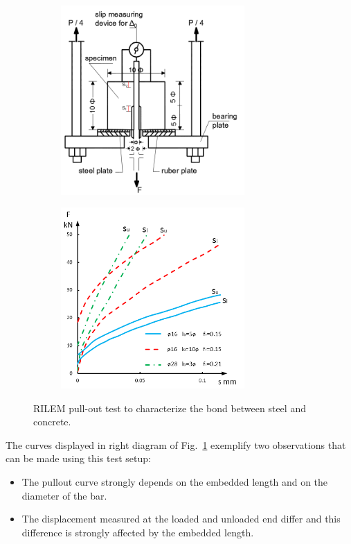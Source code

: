 \documentclass[main.tex]{subfiles}
\begin{document}
\begin{figure}[tbh]
	\centering
	\begin{subfigure}{0.45\textwidth}
	\centering
  \includegraphics[width=7cm]{fig/Lecture02/_300___pullout.png}
	\end{subfigure}
	\begin{subfigure}{0.45\textwidth}
	\centering
  \includegraphics[width=7cm]{fig/Lecture02/_300___pullout-rilem.png}
	\end{subfigure}
	\caption{RILEM pull-out test to characterize the bond between steel and concrete.}
	\label{fig_pull-out_rilem}
\end{figure}
The curves displayed in right diagram of Fig.~\ref{fig_pull-out_rilem} exemplify 
two observations that can be made using this test setup:
\begin{itemize}
    \item The pullout curve strongly depends on the embedded length and on the diameter of the bar.
    \item The displacement measured at the loaded and unloaded end differ and this difference is strongly affected by the embedded length.
\end{itemize}
\end{document}
